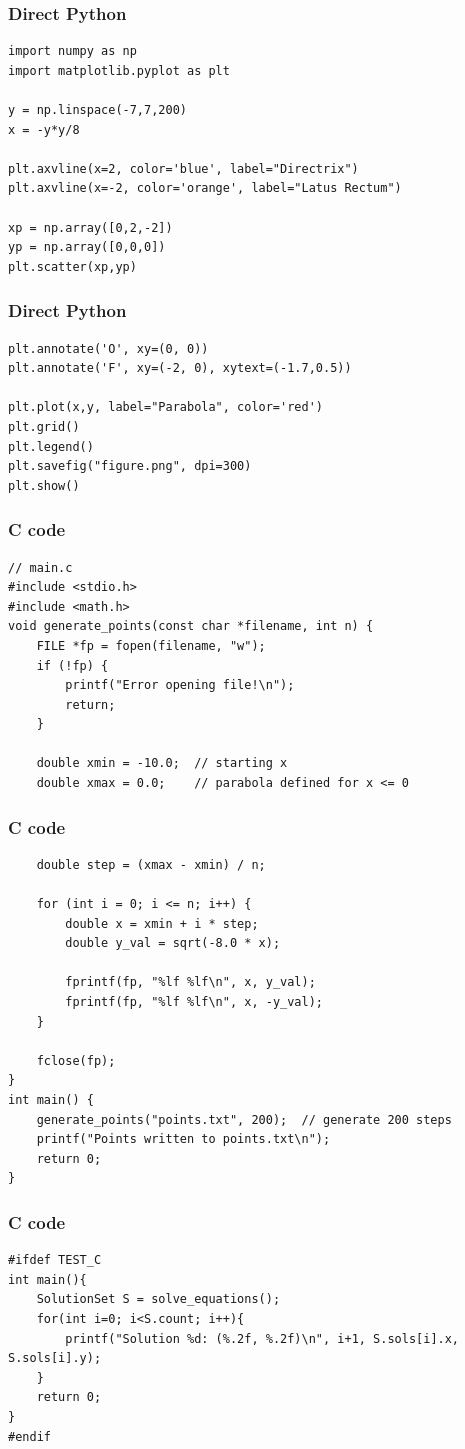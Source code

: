 \documentclass{beamer}
\begin{document}
\begin{frame}[fragile]
\frametitle{Direct Python}
\begin{lstlisting}
import numpy as np
import matplotlib.pyplot as plt

y = np.linspace(-7,7,200)
x = -y*y/8

plt.axvline(x=2, color='blue', label="Directrix")
plt.axvline(x=-2, color='orange', label="Latus Rectum")

xp = np.array([0,2,-2])
yp = np.array([0,0,0])
plt.scatter(xp,yp)
\end{lstlisting}
\end{frame}
\begin{frame}[fragile]
\frametitle{Direct Python}
\begin{lstlisting}
plt.annotate('O', xy=(0, 0)) 
plt.annotate('F', xy=(-2, 0), xytext=(-1.7,0.5)) 

plt.plot(x,y, label="Parabola", color='red')
plt.grid()
plt.legend()
plt.savefig("figure.png", dpi=300)
plt.show()
\end{lstlisting}
\end{frame}
\begin{frame}[fragile]
\frametitle{C code}
\begin{lstlisting}
// main.c
#include <stdio.h>
#include <math.h>
void generate_points(const char *filename, int n) {
    FILE *fp = fopen(filename, "w");
    if (!fp) {
        printf("Error opening file!\n");
        return;
    }

    double xmin = -10.0;  // starting x
    double xmax = 0.0;    // parabola defined for x <= 0
\end{lstlisting}
\end{frame}
\begin{frame}[fragile]
\frametitle{C code}
\begin{lstlisting}
    double step = (xmax - xmin) / n;

    for (int i = 0; i <= n; i++) {
        double x = xmin + i * step;
        double y_val = sqrt(-8.0 * x);

        fprintf(fp, "%lf %lf\n", x, y_val);
        fprintf(fp, "%lf %lf\n", x, -y_val);
    }

    fclose(fp);
}
int main() {
    generate_points("points.txt", 200);  // generate 200 steps
    printf("Points written to points.txt\n");
    return 0;
}
\end{lstlisting}
\end{frame}
\begin{frame}[fragile]
\frametitle{C code}
\begin{lstlisting}
#ifdef TEST_C
int main(){
    SolutionSet S = solve_equations();
    for(int i=0; i<S.count; i++){
        printf("Solution %d: (%.2f, %.2f)\n", i+1, S.sols[i].x, S.sols[i].y);
    }
    return 0;
}
#endif
\end{lstlisting}
\end{frame}
\end{document}
